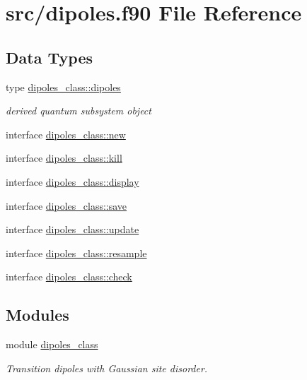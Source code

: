 \hypertarget{dipoles_8f90}{}\section{src/dipoles.f90 File Reference}
\label{dipoles_8f90}
\subsection*{Data Types}
\begin{DoxyCompactItemize}
\item 
type \hyperlink{structdipoles__class_1_1dipoles}{dipoles\+\_\+class\+::dipoles}
\begin{DoxyCompactList}\small\item\em derived quantum subsystem object \end{DoxyCompactList}\item 
interface \hyperlink{interfacedipoles__class_1_1new}{dipoles\+\_\+class\+::new}
\item 
interface \hyperlink{interfacedipoles__class_1_1kill}{dipoles\+\_\+class\+::kill}
\item 
interface \hyperlink{interfacedipoles__class_1_1display}{dipoles\+\_\+class\+::display}
\item 
interface \hyperlink{interfacedipoles__class_1_1save}{dipoles\+\_\+class\+::save}
\item 
interface \hyperlink{interfacedipoles__class_1_1update}{dipoles\+\_\+class\+::update}
\item 
interface \hyperlink{interfacedipoles__class_1_1resample}{dipoles\+\_\+class\+::resample}
\item 
interface \hyperlink{interfacedipoles__class_1_1check}{dipoles\+\_\+class\+::check}
\end{DoxyCompactItemize}
\subsection*{Modules}
\begin{DoxyCompactItemize}
\item 
module \hyperlink{namespacedipoles__class}{dipoles\+\_\+class}
\begin{DoxyCompactList}\small\item\em Transition dipoles with Gaussian site disorder. \end{DoxyCompactList}\end{DoxyCompactItemize}
